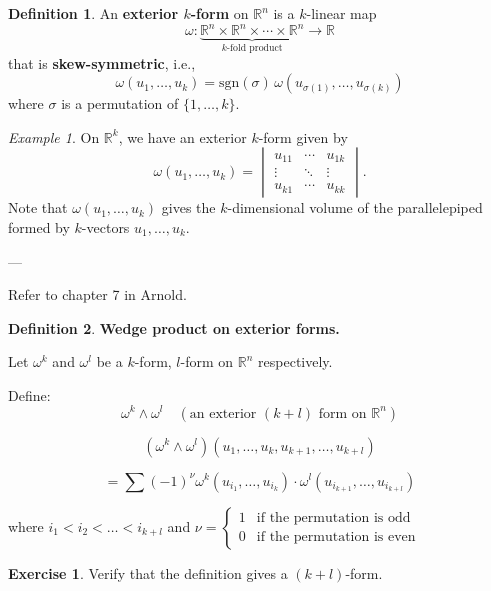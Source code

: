 \documentclass[11pt]{article}
\theoremstyle{definition}
\newtheorem{definition}{Definition}[section]
\newtheorem{exercise}{Exercise}
\theoremstyle{remark}
\newtheorem{example}{Example}[section]
\begin{document}
\begin{definition}\label{def:exterior_k_form}
An \textbf{exterior $k$-form} on $\mathbb{R}^n$ is a $k$-linear map
\[
\omega \colon \underbrace{\mathbb{R}^n \times \mathbb{R}^n \times \cdots \times \mathbb{R}^n}_{k\text{-fold product}} \to \mathbb{R}
\]
that is \textbf{skew-symmetric}, i.e.,
\[
\omega(u_1, \dots, u_k) = \text{sgn}(\sigma) \, \omega(u_{\sigma(1)}, \dots, u_{\sigma(k)})
\]
where $\sigma$ is a permutation of $\{1, \dots, k\}$.
\end{definition}

\begin{example}\label{ex:determinant_k_form}
On $\mathbb{R}^k$, we have an exterior $k$-form given by
\[
\omega(u_1, \dots, u_k) = \begin{vmatrix}
u_{11} & \cdots & u_{1k} \\
\vdots & \ddots & \vdots \\
u_{k1} & \cdots & u_{kk}
\end{vmatrix}.
\]
Note that $\omega(u_1, \dots, u_k)$ gives the $k$-dimensional volume of the parallelepiped formed by $k$-vectors $u_1, \dots, u_k$.
\end{example}

---

Refer to chapter 7 in Arnold.

\begin{definition}\label{def:wedge_product}
\textbf{Wedge product on exterior forms.}

Let $\omega^k$ and $\omega^l$ be a $k$-form, $l$-form on $\mathbb{R}^n$ respectively.

Define:
\[
\omega^k \wedge \omega^l \quad (\text{an exterior } (k+l) \text{ form on } \mathbb{R}^n)
\]

\[
(\omega^k \wedge \omega^l)(u_1, \dots, u_k, u_{k+1}, \dots, u_{k+l})
\]

\[
= \sum (-1)^\nu \omega^k(u_{i_1}, \dots, u_{i_k}) \cdot \omega^l(u_{i_{k+1}}, \dots, u_{i_{k+l}})
\]

where $i_1 < i_2 < \dots < i_{k+l}$ and $\nu = \begin{cases}
1 & \text{if the permutation is odd} \\
0 & \text{if the permutation is even}
\end{cases}$
\end{definition}

\begin{exercise}\label{ex:verify_wedge_product}
Verify that the definition gives a $(k+l)$-form.
\end{exercise}
\end{document}
